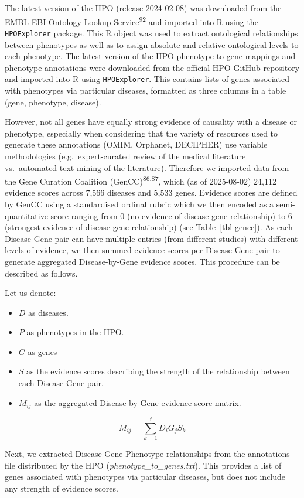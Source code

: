 \documentclass[
]{article}
\begin{document}
The latest version of the HPO (release 2024-02-08) was downloaded from
the EMBL-EBI Ontology Lookup Service\textsuperscript{92} and imported
into R using the \texttt{HPOExplorer} package. This R object was used to
extract ontological relationships between phenotypes as well as to
assign absolute and relative ontological levels to each phenotype. The
latest version of the HPO phenotype-to-gene mappings and phenotype
annotations were downloaded from the official HPO GitHub repository and
imported into R using \texttt{HPOExplorer}. This contains lists of genes
associated with phenotypes via particular diseases, formatted as three
columns in a table (gene, phenotype, disease).

However, not all genes have equally strong evidence of causality with a
disease or phenotype, especially when considering that the variety of
resources used to generate these annotations (OMIM, Orphanet, DECIPHER)
use variable methodologies (e.g.~expert-curated review of the medical
literature vs.~automated text mining of the literature). Therefore we
imported data from the Gene Curation Coalition
(GenCC)\textsuperscript{86,87}, which (as of 2025-08-02) 24,112 evidence
scores across 7,566 diseases and 5,533 genes. Evidence scores are
defined by GenCC using a standardised ordinal rubric which we then
encoded as a semi-quantitative score ranging from 0 (no evidence of
disease-gene relationship) to 6 (strongest evidence of disease-gene
relationship) (see Table~\ref{tbl-gencc}). As each Disease-Gene pair can
have multiple entries (from different studies) with different levels of
evidence, we then summed evidence scores per Disease-Gene pair to
generate aggregated Disease-by-Gene evidence scores. This procedure can
be described as follows.

Let us denote:

\begin{itemize}
\item
  \(D\) as diseases.
\item
  \(P\) as phenotypes in the HPO.
\item
  \(G\) as genes
\item
  \(S\) as the evidence scores describing the strength of the
  relationship between each Disease-Gene pair.
\item
  \(M_{ij}\) as the aggregated Disease-by-Gene evidence score matrix.
\end{itemize}

\[
M_{ij} = \sum_{k=1}^{\text{f}} D_i G_j S_k
\]

Next, we extracted Disease-Gene-Phenotype relationships from the
annotations file distributed by the HPO
(\emph{phenotype\_to\_genes.txt}). This provides a list of genes
associated with phenotypes via particular diseases, but does not include
any strength of evidence scores.
\end{document}
